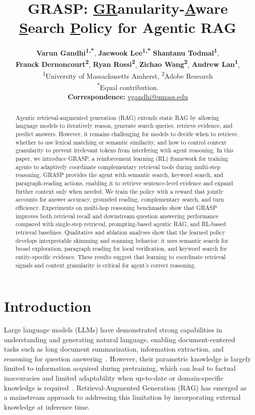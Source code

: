 \documentclass[11pt]{article}
\title{GRASP: \underline{GR}anularity-\underline{A}ware \underline{S}earch \underline{P}olicy for Agentic RAG}
\author{
 \textbf{Varun Gandhi\textsuperscript{1,*}},
 \textbf{Jaewook Lee\textsuperscript{1,*}}
 \textbf{Shantanu Todmal\textsuperscript{1}},
  \\
 \textbf{Franck Dernoncourt\textsuperscript{2}},
 \textbf{Ryan Rossi\textsuperscript{2}},
 \textbf{Zichao Wang\textsuperscript{2}},
 \textbf{Andrew Lan\textsuperscript{1}},
\\
 \textsuperscript{1}University of Massachusetts Amherst,
 \textsuperscript{2}Adobe Research
\\
 \textsuperscript{*}Equal contribution.
\\
 \small{
   \textbf{Correspondence:} \href{mailto:vgandhi@umass.edu}{vgandhi@umass.edu}
 }
}
\begin{document}
\maketitle
\begin{abstract}
Agentic retrieval-augmented generation (RAG) extends static RAG by allowing language models to iteratively reason, generate search queries, retrieve evidence, and predict answers. However, it remains challenging for models to decide when to retrieve, whether to use lexical matching or semantic similarity, and how to control context granularity to prevent irrelevant tokens from interfering with agent reasoning. In this paper, we introduce GRASP, a reinforcement learning (RL) framework for training agents to adaptively coordinate complementary retrieval tools during multi-step reasoning. GRASP provides the agent with semantic search, keyword search, and paragraph-reading actions, enabling it to retrieve sentence-level evidence and expand further context only when needed. We train the policy with a reward that jointly accounts for answer accuracy, grounded reading, complementary search, and turn efficiency. Experiments on multi-hop reasoning benchmarks show that GRASP improves both retrieval recall and downstream question answering performance compared with single-step retrieval, prompting-based agentic RAG, and RL-based retrieval baselines. Qualitative and ablation analyses show that the learned policy develops interpretable skimming and scanning behavior: it uses semantic search for broad exploration, paragraph reading for local verification, and keyword search for entity-specific evidence. These results suggest that learning to coordinate retrieval signals and context granularity is critical for agent's correct reasoning.
\end{abstract}

\section{Introduction}
\label{sec:intro}
Large language models (LLMs) have demonstrated strong capabilities in understanding and generating natural language, enabling document-centered tasks such as long document summarization, information extraction, and reasoning for question answering~\cite{perot2024lmdx,jiao2023instruct,li2024contradoc}. However, their parametric knowledge is largely limited to information acquired during pretraining, which can lead to factual inaccuracies and limited adaptability when up-to-date or domain-specific knowledge is required~\cite{li2025knowledge,wang2024factuality,nie2025embedding}. Retrieval-Augmented Generation (RAG) has emerged as a mainstream approach to addressing this limitation by incorporating external knowledge at inference time.
\end{document}
